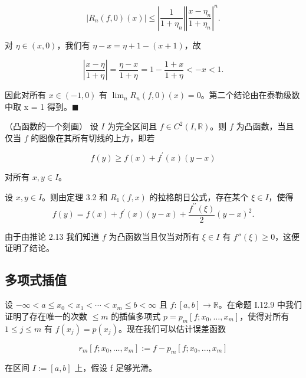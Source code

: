 \begin{application}
\begin{items}
\[
|R_{n}(f,0)(x)|\leq\left|\frac{1}{1+\eta_{n}}\right|\left|\frac{x-\eta_{n}}{1+\eta_{n}}\right|^{n}.
\]

对 $ \eta \in (x,0) $，我们有 $ \eta - x = \eta + 1 - (x+1) $，故

\[
\left|\frac{x-\eta}{1+\eta}\right|=\frac{\eta-x}{1+\eta}=1-\frac{1+x}{1+\eta}<-x<1.
\]

因此对所有 $ x \in (-1, 0) $ 有 $ \lim_{n} R_n(f, 0)(x) = 0 $。第二个结论由在泰勒级数中取 x = 1 得到。$ \blacksquare $

\item

（凸函数的一个刻画）
设 $ I $ 为完全区间且 $ f \in C^2(I, \mathbb{R}) $。则 $ f $ 为凸函数，当且仅当 $ f $ 的图像在其所有切线的上方，即若

\[
f(y)\geq f(x)+f^{\prime}(x)(y-x)
\]
\end{items}


对所有 $ x, y \in I $。

\proofhead
设 $ x, y \in I $。则由定理 3.2 和 $ R_1(f, x) $ 的拉格朗日公式，存在某个 $ \xi \in I $，使得
\[
f(y)=f(x)+f^{\prime}(x)(y-x)+\frac{f^{\prime\prime}(\xi)}{2}(y-x)^{2}.
\]

由于由推论 2.13 我们知道 $f$ 为凸函数当且仅当对所有 $\xi \in I$ 有 $f''(\xi) \geq 0$，这便证明了结论。

\end{application}

\subsection*{多项式插值}

设 $ -\infty < a \leq x_0 < x_1 < \cdots < x_m \leq b < \infty $ 且 $ f: [a, b] \to \mathbb{R} $。在命题 I.12.9 中我们证明了存在唯一的次数 $ \leq m $ 的插值多项式 $ p = p_m[f; x_0, \ldots, x_m] $，使得对所有 $ 1 \leq j \leq m $ 有 $ f(x_j) = p(x_j) $。现在我们可以估计误差函数

\begin{equation}
r_{m}[f;x_{0},\ldots,x_{m}]:=f-p_{m}[f;x_{0},\ldots,x_{m}]
\end{equation}

在区间 $ I := [a, b] $ 上，假设 f 足够光滑。

